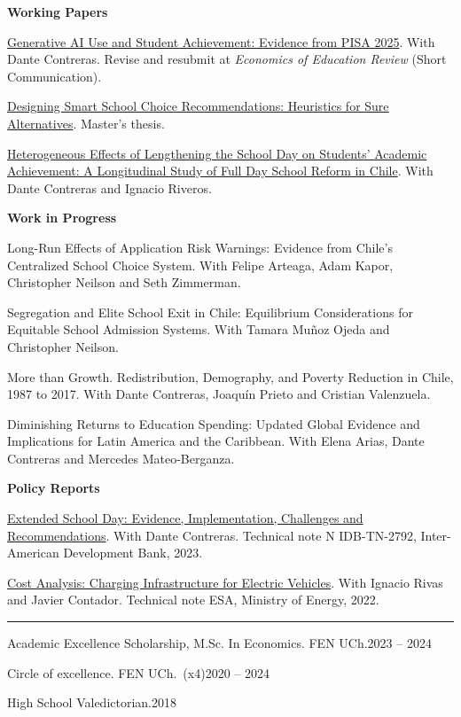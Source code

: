 \documentclass[11pt]{article}
\newcommand{\tlink}[2]{\href{#1}{\textcolor{linkblue}{#2}}}
\newcommand{\cvsection}[1]{\vspace{9pt}{\bfseries #1}\par\vspace{2pt}\hrule\vspace{6pt}}
\newcommand{\gap}{\vspace{7pt}}
\begin{document}
\textbf{Working Papers}
\gap

\tlink{https://papers.ssrn.com/sol3/papers.cfm?abstract_id=7752238}{Generative AI Use and Student Achievement: Evidence from PISA 2025}. With Dante Contreras. Revise and resubmit at \textit{Economics of Education Review} (Short Communication).
\gap

\tlink{https://lepe.cl/papers/designing-smart-school-choice.html}{Designing Smart School Choice Recommendations: Heuristics for Sure Alternatives}. Master's thesis.
\gap

\tlink{https://lepe.cl/papers/heterogeneous-effects-school-day.html}{Heterogeneous Effects of Lengthening the School Day on Students' Academic Achievement: A Longitudinal Study of Full Day School Reform in Chile}. With Dante Contreras and Ignacio Riveros.
\gap

\textbf{Work in Progress}
\gap

Long-Run Effects of Application Risk Warnings: Evidence from Chile's Centralized School Choice System. With Felipe Arteaga, Adam Kapor, Christopher Neilson and Seth Zimmerman.
\gap

Segregation and Elite School Exit in Chile: Equilibrium Considerations for Equitable School Admission Systems. With Tamara Muñoz Ojeda and Christopher Neilson.
\gap

More than Growth. Redistribution, Demography, and Poverty Reduction in Chile, 1987 to 2017. With Dante Contreras, Joaquín Prieto and Cristian Valenzuela.
\gap

Diminishing Returns to Education Spending: Updated Global Evidence and Implications for Latin America and the Caribbean. With Elena Arias, Dante Contreras and Mercedes Mateo-Berganza.
\gap

\textbf{Policy Reports}
\gap

\tlink{https://lepe.cl/papers/extended-school-day.html}{Extended School Day: Evidence, Implementation, Challenges and Recommendations}. With Dante Contreras. Technical note N\textdegree{} IDB-TN-2792, Inter-American Development Bank, 2023.
\gap

\tlink{https://lepe.cl/papers/cost-analysis-ev.html}{Cost Analysis: Charging Infrastructure for Electric Vehicles}. With Ignacio Rivas and Javier Contador. Technical note ESA, Ministry of Energy, 2022.

\cvsection{AWARDS \& FELLOWSHIPS}

Academic Excellence Scholarship, M.Sc. In Economics. FEN UCh.\hfill 2023 -- 2024\par
Circle of excellence. FEN UCh.\ (x4)\hfill 2020 -- 2024\par
High School Valedictorian.\hfill 2018\par
\end{document}
